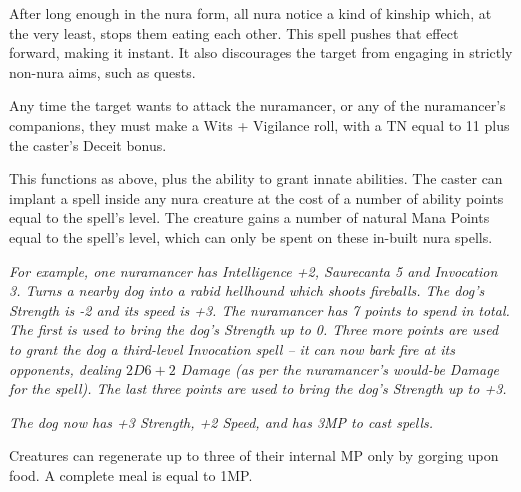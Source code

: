 After long enough in the nura form, all nura notice a kind of kinship which, at the very least, stops them eating each other.  This spell pushes that effect forward, making it instant.  It also discourages the target from engaging in strictly non-nura aims, such as quests.

Any time the target wants to attack the nuramancer, or any of the nuramancer's companions, they must make a Wits + Vigilance roll, with a TN equal to 11 plus the caster's Deceit bonus.

\spelllevel
{}

This functions as above, plus the ability to grant innate abilities.  The caster can implant a spell inside any nura creature at the cost of a number of ability points equal to the spell's level.  The creature gains a number of natural Mana Points equal to the spell's level, which can only be spent on these in-built nura spells.

\textit{For example, one nuramancer has Intelligence +2, Saurecanta 5 and Invocation 3.  Turns a nearby dog into a rabid hellhound which shoots fireballs.  The dog's Strength is -2 and its speed is +3.  The nuramancer has 7 points to spend in total.  The first is used to bring the dog's Strength up to 0.  Three more points are used to grant the dog a third-level Invocation spell -- it can now bark fire at its opponents, dealing $2D6+2$ Damage (as per the nuramancer's would-be Damage for the spell).  The last three points are used to bring the dog's Strength up to +3.}

\textit{The dog now has +3 Strength, +2 Speed, and has 3MP to cast spells.}

\noindent Creatures can regenerate up to three of their internal MP only by gorging upon food.  A complete meal is equal to 1MP.

